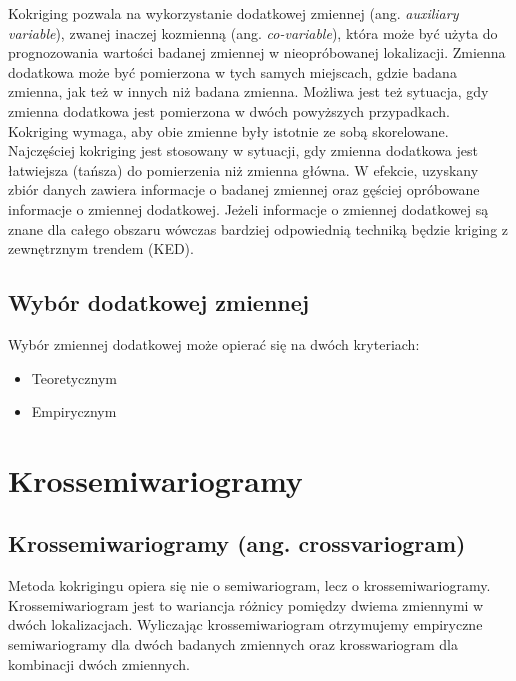\documentclass[
  paper=6in:9in,pagesize=pdftex,headinclude=on,footinclude=on,10pt]{scrbook}
\providecommand{\tightlist}{%
  \setlength{\itemsep}{0pt}\setlength{\parskip}{0pt}}
\begin{document}
Kokriging pozwala na wykorzystanie dodatkowej zmiennej (ang. \emph{auxiliary variable}), zwanej inaczej kozmienną (ang. \emph{co-variable}), która może być użyta do prognozowania wartości badanej zmiennej w nieopróbowanej lokalizacji.
Zmienna dodatkowa może być pomierzona w tych samych miejscach, gdzie badana zmienna, jak też w innych niż badana zmienna.
Możliwa jest też sytuacja, gdy zmienna dodatkowa jest pomierzona w dwóch powyższych przypadkach.
Kokriging wymaga, aby obie zmienne były istotnie ze sobą skorelowane.
Najczęściej kokriging jest stosowany w sytuacji, gdy zmienna dodatkowa jest łatwiejsza (tańsza) do pomierzenia niż zmienna główna.
W efekcie, uzyskany zbiór danych zawiera informacje o badanej zmiennej oraz gęściej opróbowane informacje o zmiennej dodatkowej.
Jeżeli informacje o zmiennej dodatkowej są znane dla całego obszaru wówczas bardziej odpowiednią techniką będzie kriging z zewnętrznym trendem (KED).

\subsection{Wybór dodatkowej zmiennej}\label{wybuxf3r-dodatkowej-zmiennej}

Wybór zmiennej dodatkowej może opierać się na dwóch kryteriach:

\begin{itemize}
\tightlist
\item
  Teoretycznym
\item
  Empirycznym
\end{itemize}

\section{Krossemiwariogramy}\label{krossemiwariogramy}

\subsection{\texorpdfstring{Krossemiwariogramy (ang. \textbf{crossvariogram})}{Krossemiwariogramy (ang. crossvariogram)}}\label{krossemiwariogramy-ang.-crossvariogram}

Metoda kokrigingu opiera się nie o semiwariogram, lecz o krossemiwariogramy.
Krossemiwariogram jest to wariancja różnicy pomiędzy dwiema zmiennymi w dwóch lokalizacjach.
Wyliczając krossemiwariogram otrzymujemy empiryczne semiwariogramy dla dwóch badanych zmiennych oraz krosswariogram dla kombinacji dwóch zmiennych.
\end{document}

